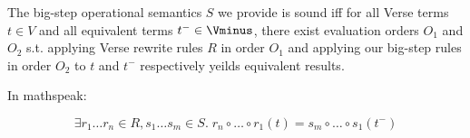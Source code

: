\documentclass[]{article}
\begin{document}
The big-step operational semantics $S$ we provide is sound iff for all 
Verse terms $t \in V$ and all equivalent \Vminus terms $t^{-} \in \Vminus$, 
there exist evaluation orders $O_{1}$ and $O_{2}$ s.t. applying Verse 
rewrite rules $R$ in order $O_{1}$ and applying our big-step rules in order 
$O_{2}$ to $t$ and $t^{-}$ respectively yeilds equivalent results. 

In mathspeak: 

\[
    \exists r_{1} \dots r_{n} \in R, s_{1} \dots s_{m} \in S .\;
  r_{n} \circ \dots \circ r_{1}(t) = s_{m} \circ \dots \circ s_{1}(t^{-})
  \]

\end{document}
